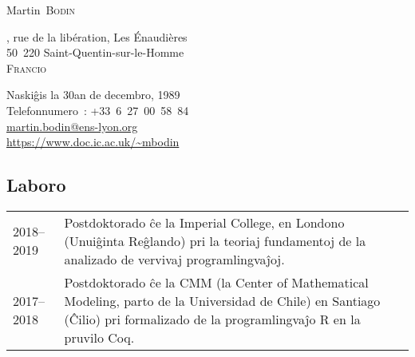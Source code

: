 \documentclass[12pt,a4paper]{article}
\makeatletter
\newcommand{\en}[1]{\foreignlanguage{english}{{#1}}}
\newcommand{\es}[1]{\foreignlanguage{spanish}{{#1}}}
\newcommand{\en}[1]{\foreignlanguage{english}{{#1}}}
\newcommand{\es}[1]{\foreignlanguage{spanish}{{#1}}}
\newenvironment{datecvsection}[1]%
               {\subsection*{#1}%
                 \noindent \begin{tabular}{@{}p{\annee}p{\texte}@{}}}
               {\end{tabular}}
\newcommand\familyName{\textsc}
\newcommand\placeName{}
\makeatother
\begin{document}
\pagestyle{empty}


\newlength{\annee}
\settowidth{\annee}{9999--9999}


\newlength{\texte}
\setlength{\texte}{\textwidth} \addtolength{\texte}{-\annee} 
	\addtolength{\texte}{-2\tabcolsep}

\begin{center} \Huge Martin~\familyName{Bodin} \end{center}

\parbox[c]{.5\textwidth}
{
  , rue de la libération,
  Les Énaudières \\
  50~220 Saint-Quentin-sur-le-Homme \\
  \textsc{Francio}
}
\parbox[c]{.55\textwidth}
{
\begin{flushright}
  Naskiĝis la 30an de decembro, 1989 \\
  \noindent Telefonnumero~: \mbox{+33 6 27 00 58 84} \\
  \url{martin.bodin@ens-lyon.org} \\
  \url{https://www.doc.ic.ac.uk/~mbodin}
\end{flushright}
}


\begin{datecvsection}{Laboro}

    2018–2019 & Postdoktorado ĉe la \en{\placeName{Imperial College}}, en \placeName{Londono} (\placeName{Unuiĝinta Reĝlando}) pri la teoriaj fundamentoj de la analizado de vervivaj programlingvaĵoj. \\

    2017–2018 & Postdoktorado ĉe la \placeName{CMM} (la \en{\placeName{Center of Mathematical Modeling}}, parto de la \es{\placeName{Universidad de Chile}}) en \placeName{Santiago} (\placeName{Ĉilio}) pri formalizado de la programlingvaĵo R en la pruvilo Coq. \\

\end{datecvsection}
\end{document}

